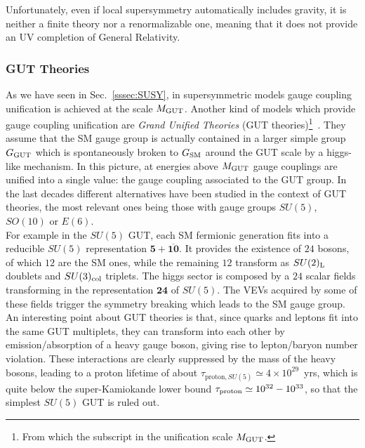 \documentclass[12pt,a4paper]{book}
\begin{document}
Unfortunately, even if local supersymmetry automatically includes gravity, it is neither a finite theory nor a renormalizable one, meaning that it does not provide an UV completion of General Relativity.

\subsubsection{GUT Theories}
\label{sssec:GUTs}

As we have seen in Sec.~\ref{sssec:SUSY}, in supersymmetric models gauge coupling unification is achieved at the scale $M_{\rm GUT}$. Another kind of models which provide gauge coupling unification are \textit{Grand Unified Theories} (GUT theories)\footnote{From which the subscript in the unification scale $M_{\rm GUT}$.}~\cite{Ross:1985ai}. They assume that the SM gauge group is actually contained in a larger simple group $G_{\rm GUT}$ which is spontaneously broken to $G_{\rm SM}$ around the GUT scale by a higgs-like mechanism. In this picture, at energies above $M_{\rm GUT}$ gauge couplings are unified into a single value: the gauge coupling associated to the GUT group. In the last decades different alternatives have been studied in the context of GUT theories, the most relevant ones being those with gauge groups $SU(5)$, $SO(10)$ or $E(6)$.\\

For example in the $SU(5)$ GUT, each SM fermionic generation fits into a reducible $SU(5)$ representation $\mathbf{5} + \overline{\mathbf{10}}$. It provides the existence of $24$ bosons, of which $12$ are the SM ones, while the remaining $12$ transform as $SU(2)_{\rm L}$ doublets and $SU(3)_{\rm col}$ triplets. The higgs sector is composed by a $24$ scalar fields transforming in the representation $\mathbf{24}$ of $SU(5)$. The VEVs acquired by some of these fields trigger the symmetry breaking which leads to the SM gauge group. An interesting point about GUT theories is that, since quarks and leptons fit into the same GUT multiplets, they can transform into each other by emission/absorption of a heavy gauge boson, giving rise to lepton/baryon number violation. These interactions are clearly suppressed by the mass of the heavy bosons, leading to a proton lifetime of about $\tau_{\text{proton}, SU(5)} \simeq 4 \times 10^{29} \,$ yrs, which is quite below the super-Kamiokande lower bound $\tau_{\rm proton} \simeq 10^{32} - 10^{33}$, so that the simplest $SU(5)$ GUT is ruled out.\\
\end{document}
